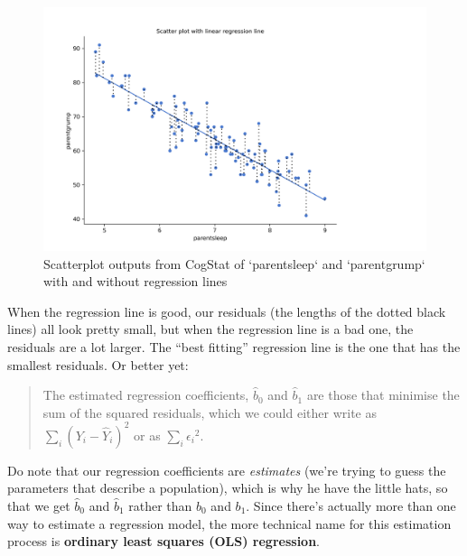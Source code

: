 \documentclass[
  11pt,
  a4paper,
  twoside,symmetric,openright]{book}
\theoremstyle{break}
\theoremstyle{break}
\begin{document}
\begin{figure}

{\centering \includegraphics[width=0.6\linewidth]{resources/image/parentresiduallines} 

}

\caption{Scatterplot outputs from CogStat of `parentsleep` and `parentgrump` with and without regression lines}\label{fig:parentscatterswithresiduals}
\end{figure}

When the regression line is good, our residuals (the lengths of the dotted black lines) all look pretty small, but when the regression line is a bad one, the residuals are a lot larger. The ``best fitting'' regression line is the one that has the smallest residuals. Or better yet:

\begin{quote}
The estimated regression coefficients, \(\hat{b}_0\) and \(\hat{b}_1\) are those that minimise the sum of the squared residuals, which we could either write as \(\sum_i (Y_i - \hat{Y}_i)^2\) or as \(\sum_i {\epsilon_i}^2\).
\end{quote}

Do note that our regression coefficients are \emph{estimates} (we're trying to guess the parameters that describe a population), which is why he have the little hats, so that we get \(\hat{b}_0\) and \(\hat{b}_1\) rather than \(b_0\) and \(b_1\). Since there's actually more than one way to estimate a regression model, the more technical name for this estimation process is \textbf{ordinary least squares (OLS) regression}.
\end{document}
